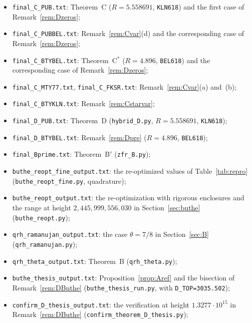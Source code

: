 \documentclass{amsart}
\theoremstyle{definition}
\theoremstyle{remark}
\theoremstyle{plain}
\numberwithin{equation}{section}
\newcommand{\TB}{1.3277\cdot10^{15}}
\newcommand{\Cstar}{C$^*$}
\newcommand{\Bp}{B$'$}
\begin{document}
\begin{itemize}
\item \texttt{final\_\allowbreak{}C\_\allowbreak{}PUB.txt}: Theorem~C ($R=5.558691$, \texttt{KLN618}) and the first case of Remark~\ref{rem:Dzeros};
\item \texttt{final\_\allowbreak{}C\_\allowbreak{}PUBBEL.txt}: Remark~\ref{rem:Cvar}(d) and the corresponding case of Remark~\ref{rem:Dzeros};
\item \texttt{final\_\allowbreak{}C\_\allowbreak{}BTYBEL.txt}: Theorem~\Cstar{} ($R=4.896$, \texttt{BEL618}) and the corresponding case of Remark~\ref{rem:Dzeros};
\item \texttt{final\_\allowbreak{}C\_\allowbreak{}MTY77.txt}, \texttt{final\_\allowbreak{}C\_\allowbreak{}FKSR.txt}: Remark~\ref{rem:Cvar}(a) and~(b);
\item \texttt{final\_\allowbreak{}C\_\allowbreak{}BTYKLN.txt}: Remark~\ref{rem:Cstarvar};
\item \texttt{final\_\allowbreak{}D\_\allowbreak{}PUB.txt}: Theorem~D (\texttt{hybrid\_\allowbreak{}D.py}, $R=5.558691$, \texttt{KLN618});
\item \texttt{final\_\allowbreak{}D\_\allowbreak{}BTYBEL.txt}: Remark~\ref{rem:Dpre} ($R=4.896$, \texttt{BEL618});
\item \texttt{final\_\allowbreak{}Bprime.txt}: Theorem~\Bp{} (\texttt{zfr\_\allowbreak{}B.py});
\item \texttt{buthe\_\allowbreak{}reopt\_\allowbreak{}fine\_\allowbreak{}output.txt}: the re-optimized values of Table~\ref{tab:repro} (\texttt{buthe\_\allowbreak{}reopt\_\allowbreak{}fine.py}, quadrature);
\item \texttt{buthe\_\allowbreak{}reopt\_\allowbreak{}output.txt}: the re-optimization with rigorous enclosures and the range at height $2{,}445{,}999{,}556{,}030$ in Section~\ref{sec:buthe} (\texttt{buthe\_\allowbreak{}reopt.py});
\item \texttt{qrh\_\allowbreak{}ramanujan\_\allowbreak{}output.txt}: the case $\theta=7/8$ in Section~\ref{sec:B} (\texttt{qrh\_\allowbreak{}ramanujan.py});
\item \texttt{qrh\_\allowbreak{}theta\_\allowbreak{}output.txt}: Theorem~B (\texttt{qrh\_\allowbreak{}theta.py});
\item \texttt{buthe\_\allowbreak{}thesis\_\allowbreak{}output.txt}: Proposition~\ref{prop:Aref} and the bisection of Remark~\ref{rem:DButhe} (\texttt{buthe\_\allowbreak{}thesis\_\allowbreak{}run.py}, with \texttt{D\_\allowbreak{}TOP=3035.502});
\item \texttt{confirm\_\allowbreak{}D\_\allowbreak{}thesis\_\allowbreak{}output.txt}: the verification at height $\TB$ in Remark~\ref{rem:DButhe} (\texttt{confirm\_\allowbreak{}theorem\_\allowbreak{}D\_\allowbreak{}thesis.py});

\end{itemize}
\end{document}
